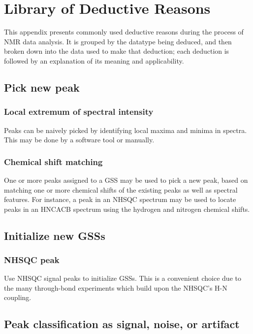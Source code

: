 \chapter{Library of Deductive Reasons}
\label{sec_library}

This appendix presents commonly used deductive reasons during the process
of NMR data analysis.  It is grouped by the datatype being deduced, and then
broken down into the data used to make that deduction; each deduction is 
followed by an explanation of its meaning and applicability.


\section*{Pick new peak}

\subsection*{Local extremum of spectral intensity}
Peaks can be naively picked by identifying local maxima and minima in spectra.
This may be done by a software tool or manually.

\subsection*{Chemical shift matching}
One or more peaks assigned to a GSS may be used to pick a new peak,
based on matching one or more chemical shifts of the existing peaks
as well as spectral features.  For instance, a peak in an NHSQC spectrum
may be used to locate peaks in an HNCACB spectrum using the hydrogen and
nitrogen chemical shifts.



\section*{Initialize new GSSs}

\subsection*{NHSQC peak}
Use NHSQC signal peaks to initialize GSSs.  This is a convenient choice due
to the many through-bond experiments which build upon the NHSQC's H-N coupling.



\section*{Peak classification as signal, noise, or artifact}

